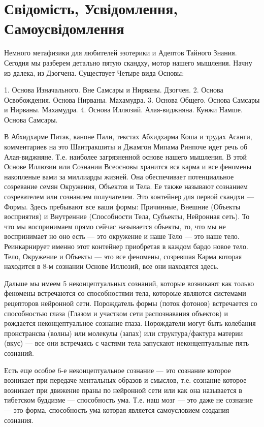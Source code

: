 \section{Свідомість, Усвідомлення, Самоусвідомлення}

Немного метафизики для любителей эзотерики и Адептов Тайного Знания. Сегодня мы разберем детально пятую скандху, мотор нашего мышления. Начну из далека, из Дзогчена. Существует Четыре вида Основы:

1. Основа Изначального. Вне Самсары и Нирваны. Дзогчен.
2. Основа Освобождения. Основа Нирваны. Махамудра. 
3. Основа Общего. Основа Самсары и Нирваны. Махамудра.
4. Основа Иллюзий. Алая-виджняна. Кунжи Намше. Основа Самсары. 

В Абхидхарме Питак, каноне Пали, текстах Абхидхарма Коша и трудах Асанги, комментариев на это Шантракшиты и Джамгон Мипама Ринпоче идет речь об Алая-виджняне. Т.е. наиболее загрязненной основе нашего мышления. В этой Основе Иллюзии или Сознании Всеосновы хранится вся карма и все феномены накопленые вами за миллиарды жизней. Она обеспечивает потенциальное созревание семян Окружения, Объектов и Тела. Ее также называют сознанием созревателем или сознанием получателем. Это контейнер для первой скандхи — Формы. Здесь пребывают все ваши формы: Причинные, Внешние (Объекты восприятия) и Внутренние (Способности Тела, Субъекты, Нейронная сеть). То что мы воспринимаем прямо сейчас называется объекты, то, что мы не воспринимает но оно есть — это окружение и наше Тело — это наше тело. Реинкарнирует именно этот контейнер приобретая в каждом бардо новое тело. Тело, Окружение и Объекты — это все феномены, созревшая Карма которая находится в 8-м сознании Основе Иллюзий, все они находятся здесь.

Дальше мы имеем 5 неконцептуальных сознаний, которые возникают как только феномены встречаются со способностями тела, котороые являются системами рецепторов нейронной сети. Порождатель формы (поток фотонов) встречается со способностью глаза (Глазом и участком сети распознавания объектов) и рождается неконцептуальное сознание глаза. Порождатели могут быть колебания пронстрансва (волны) или молекулы (запах) или структура/фактура материи (вкус) — все они встречаясь с частями тела запускают неконцептуальные пять сознаний. 

Есть еще особое 6-е неконцептуальное сознание — это сознание которое возникает при передаче ментальных образов и смыслов, т.е. сознание которое возникает при движение праны по нейронной сети или как она называется в тибетском буддизме — способность ума. Т.е. наш мозг — это даже не сознание — это форма, способность ума которая является самоусловием создания сознания.

